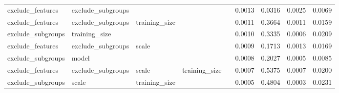 \begin{table}
\begin{tabular}{llllrrrr}
 exclude\_features & exclude\_subgroups &               &               &               &                0.0013 &           0.0316 &         0.0025 &    0.0069 \\
 exclude\_features & exclude\_subgroups & training\_size &               &               &                0.0011 &           0.3664 &         0.0011 &    0.0159 \\
exclude\_subgroups &     training\_size &               &               &               &                0.0010 &           0.3335 &         0.0006 &    0.0209 \\
 exclude\_features & exclude\_subgroups &         scale &               &               &                0.0009 &           0.1713 &         0.0013 &    0.0169 \\
exclude\_subgroups &             model &               &               &               &                0.0008 &           0.2027 &         0.0005 &    0.0085 \\
 exclude\_features & exclude\_subgroups &         scale & training\_size &               &                0.0007 &           0.5375 &         0.0007 &    0.0200 \\
exclude\_subgroups &             scale & training\_size &               &               &                0.0005 &           0.4804 &         0.0003 &    0.0231 \\
\bottomrule
\end{tabular}
\end{table}
